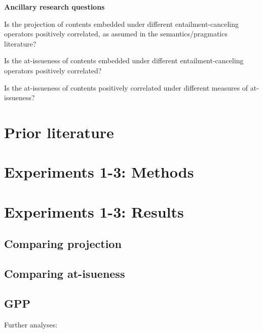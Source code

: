 \documentclass[11pt,fleqn]{article}
\newcommand{\6}{\mbox{$[\hspace*{-.6mm}[$}}
\newcommand{\9}{\mbox{$]\hspace*{-.6mm}]$}}
\begin{document}
\begin{exe}
\ex\label{rqs} {\bf Ancillary research questions}
\begin{xlist}
\ex Is the projection of contents embedded under different entailment-canceling operators positively correlated, as assumed in the semantics/pragmatics literature?

\ex Is the at-issueness of contents embedded under different entailment-canceling operators positively correlated?

\ex Is the at-issueness of contents positively correlated under different measures of at-issueness?
\end{xlist}
\end{exe}

\section{Prior literature}\label{s2}

\section{Experiments 1-3: Methods}\label{s3}

\section{Experiments 1-3: Results}\label{s4}

\subsection{Comparing projection}

\subsection{Comparing at-isueness}

\subsection{GPP}

Further analyses:
\end{document}
